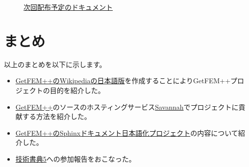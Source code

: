 \documentclass{../../style/ltjoc}
\begin{document}
\begin{figure}[htbp]
\centering
{}
\caption{\href{https://techbookfest.org}{次回配布予定のドキュメント}}
\label{fig:tecbookfest6-book}
\end{figure}
\section{まとめ}
以上のまとめを以下に示します。
\begin{itemize}
  \item{\href{https://ja.wikipedia.org/wiki/GetFEM++}{GetFEM++のWikipediaの日本語版}を作成することによりGetFEM++プロジェクトの目的を紹介した。}
  \item{\href{http://getfem.org}{GetFEM++}のソースのホスティングサービス\href{https://savannah.gnu.org}{Savannah}でプロジェクトに貢献する方法を紹介した。}
  \item{\href{http://www.sphinx-doc.org/ja/stable/intl.html}{GetFEM++のSphinxドキュメント日本語化プロジェクト}の内容について紹介した。}
  \item{\href{https://techbookfest.org/event/tbf05}{技術書典5}への参加報告をおこなった。}
\end{itemize}
\end{document}
